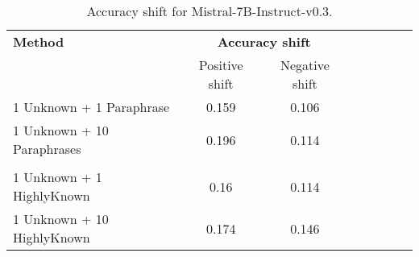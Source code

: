 \begin{table*}[!ht]
    \centering
    \footnotesize
    \setlength{\tabcolsep}{2pt}
\begin{tabular}{lccccccc}
\toprule

{\textbf{Method}}            & \multicolumn{2}{c}{\textbf{Accuracy shift}}\\ %
{}                             & {Positive shift}     & { Negative shift}             \\ \midrule
{1 Unknown + 1 Paraphrase}          & {0.159}     & {0.106}           \\
{1 Unknown + 10 Paraphrases}         & {0.196}    & {0.114}          \\
\midrule
                                     &     &             \\ 
\midrule
{1 Unknown + 1 HighlyKnown}        & {0.16}    & {0.114}          \\
{1 Unknown + 10 HighlyKnown}        & {0.174}     & {0.146}          \\

\bottomrule
\end{tabular}                   
\caption{Accuracy shift for Mistral-7B-Instruct-v0.3.}
\label{table:mistral_add_main_example}

\end{table*}